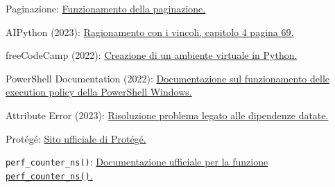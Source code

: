 \documentclass[12pt, letterpaper]{article}
\begin{document}
\begin{thebibliography}{100}
      Paginazione: \href{https://www.educative.io/answers/what-is-pagination}{
            Funzionamento della paginazione.
      }

      AIPython (2023): \href{https://artint.info/AIPython/aipython/aipython.pdf}{
            Ragionamento con i vincoli, capitolo 4 pagina 69.
      }

      freeCodeCamp (2022):  \href{https://www.freecodecamp.org/news/how-to-setup-virtual-environments-in-python/}{
            Creazione di un ambiente virtuale in Python.
      }

      PowerShell Documentation (2022):
      \href{https://learn.microsoft.com/en-gb/powershell/module/microsoft.powershell.core/about/about_execution_policies?view=powershell-7.4}{
            Documentazione sul funzionamento delle execution policy della PowerShell Windows.
      }

      Attribute Error (2023): \href{https://stackoverflow.com/questions/70749690/attributeerror-module-collections-has-no-attribute-mapping}{
            Risoluzione problema legato alle dipendenze datate.
      }

      Protégé: \href{https://protege.stanford.edu/}{Sito ufficiale di Protégé.}

      \lstinline|perf_counter_ns()|: \href{https://docs.python.org/3/library/time.html#time.perf_counter_ns}{
            Documentazione ufficiale per la funzione \lstinline|perf_counter_ns()|.
      }


\end{thebibliography}
\end{document}
